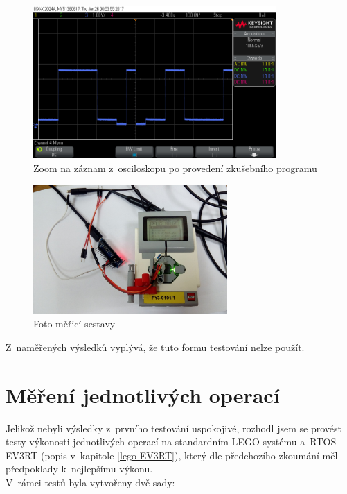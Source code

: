 \begin{figure}[h]
	\centering
	\includegraphics[width=350px]{images/measuring-oscilloscope_ev3-software_led-blinking_part1.png}
	\caption[Zoom na záznam z~osciloskopu po provedení zkušebního programu]{Zoom na záznam z~osciloskopu po provedení zkušebního programu}
	\label{fig:measuring_lego-ev3_orig-soft_led-blinking_part1}
\end{figure}

\begin{figure}[h]
	\centering
	\includegraphics[width=280px]{images/measuring-system_photo.jpg}
	\caption[Foto měřicí sestavy]{Foto měřicí sestavy}
	\label{fig:measuring-system_photo}
\end{figure}

Z~naměřených výsledků vyplývá, že tuto formu testování nelze použít.

\section{Měření jednotlivých operací}

Jelikož nebyli výsledky z~prvního testování uspokojivé, rozhodl jsem se provést testy výkonosti jednotlivých operací na standardním LEGO systému a~RTOS EV3RT (popis v~kapitole \ref{lego-EV3RT}), který dle předchozího zkoumání měl předpoklady k~nejlepšímu výkonu.  \\

V~rámci testů byla vytvořeny dvě sady: 

